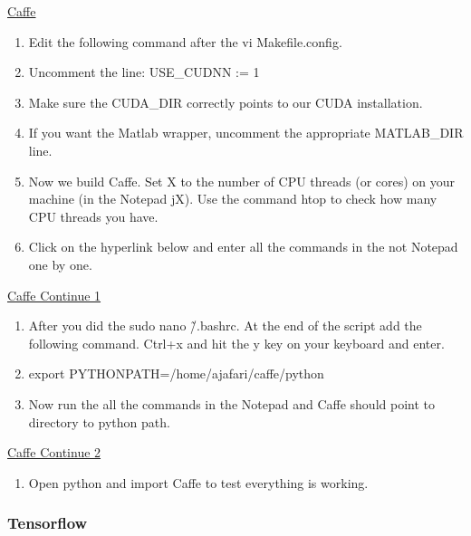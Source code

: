 \documentclass[12pt]{article}
\begin{document}
\begin{center}
\href{run:./Text_Files_14/Caffe.txt}{\Large Caffe}
\end{center}

\begin{enumerate}[resume]
  \item Edit the following command after the vi Makefile.config.
  \item Uncomment the line: USE\_CUDNN := 1
  \item Make sure the CUDA\_DIR correctly points to our CUDA installation.
  \item If you want the Matlab wrapper, uncomment the appropriate MATLAB\_DIR line.
  \item Now we build Caffe. Set X to the number of CPU threads (or cores) on your machine (in the Notepad jX). Use the command htop to check how many CPU threads you have.
  \item Click on the hyperlink below and enter all the commands in the not Notepad one by one.
\end{enumerate}

\begin{center}
\href{run:./Text_Files_14/Caffe1.txt}{\Large Caffe Continue 1}
\end{center}

\begin{enumerate}[resume]
   \item After you did the sudo nano \~/.bashrc. At the end of the script add the following command. Ctrl+x and hit the y key on your keyboard and enter.
   \item export PYTHONPATH=/home/ajafari/caffe/python
   \item Now run the all the commands in the Notepad and Caffe should point to directory to python path.
\end{enumerate}

\begin{center}
\href{run:./Text_Files_14/Caffe2.txt}{\Large Caffe Continue 2}
\end{center}

\begin{enumerate}[resume]
   \item Open python and import Caffe to test everything is working.
\end{enumerate}


\subsubsection{Tensorflow}
\end{document}
